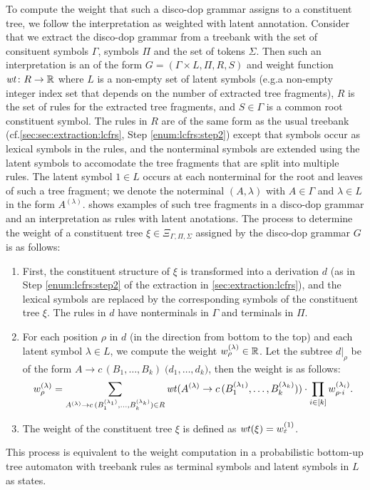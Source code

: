 \documentclass[../../document.tex]{subfiles}
\begin{document}
    To compute the weight that such a disco-dop grammar assigns to a constituent tree, we follow the interpretation as weighted  with latent annotation.
    Consider that we extract the disco-dop grammar from a treebank with the set of consituent symbols \(\varGamma\),  symbols \(\varPi\) and the set of tokens \(\varSigma\).
    Then such an interpretation is an  of the form \(G = (\varGamma \times L, \varPi, R, S)\) and weight function \(\mathit{wt}\colon R \to \mathbb{R}\)  where \(L\) is a non-empty set of latent symbols (e.g.\@ a non-empty integer index set that depends on the number of extracted tree fragments), \(R\) is the set of rules for the extracted tree fragments, and \(S \in \varGamma\) is a common root constituent symbol.
    The rules in \(R\) are of the same form as the usual treebank  (cf.\@ \cref{sec:sec:extraction:lcfrs}, Step \ref{enum:lcfrs:step2}) except that  symbols occur as lexical symbols in the rules, and the nonterminal symbols are extended using the latent symbols to accomodate the tree fragments that are split into multiple rules.
    The latent symbol \(1 \in L\) occurs at each nonterminal for the root and leaves of such a tree fragment; we denote the noterminal \((A, \lambda)\) with \(A\in \varGamma\) and \(\lambda \in L\) in the form \(A^{(\lambda)}\).
     shows examples of such tree fragments in a disco-dop grammar and an interpretation as  rules with latent anotations.
    The process to determine the weight of a constituent tree \(\xi \in \Xi_{\varGamma, \varPi, \varSigma}\) assigned by the disco-dop grammar \(G\) is as follows:
    \begin{enumerate}
        \item First, the constituent structure of \(\xi\) is transformed into a  derivation \(d\) (as in Step \ref{enum:lcfrs:step2} of the extraction in \cref{sec:extraction:lcfrs}), and the lexical symbols are replaced by the corresponding  symbols of the constituent tree \(\xi\). The rules in \(d\) have nonterminals in \(\varGamma\) and terminals in \(\varPi\).
        \item For each position \(\rho\) in \(d\) (in the direction from bottom to the top) and each latent symbol \(\lambda \in L\), we compute the weight \(w_\rho^{(\lambda)} \in \mathbb{R}\). Let the subtree \(d|_\rho\) be of the form \(A \to c\,(B_1, \ldots, B_k)\;\big(d_1, \ldots, d_k)\), then the weight is as follows:
            \[
                w_\rho^{(\lambda)} = \sum_{A^{(\lambda)} \to c\,(B_1^{(\lambda_1)}, \ldots, B_k^{(\lambda_k)}) \in R} \mathit{wt}(A^{(\lambda)} \to c\,(B_1^{(\lambda_1)}, \ldots, B_k^{(\lambda_k)})) \cdot \prod_{i \in [k]} w_{\rho\cdot i}^{(\lambda_i)} \text{.}
            \]
        \item The weight of the constituent tree \(\xi\) is defined as \(\mathit{wt}(\xi) = w_\varepsilon^{(1)}\).
    \end{enumerate}
    This process is equivalent to the weight computation in a probabilistic bottom-up tree automaton with treebank  rules as terminal symbols and latent symbols in \(L\) as states.
    
\end{document}
